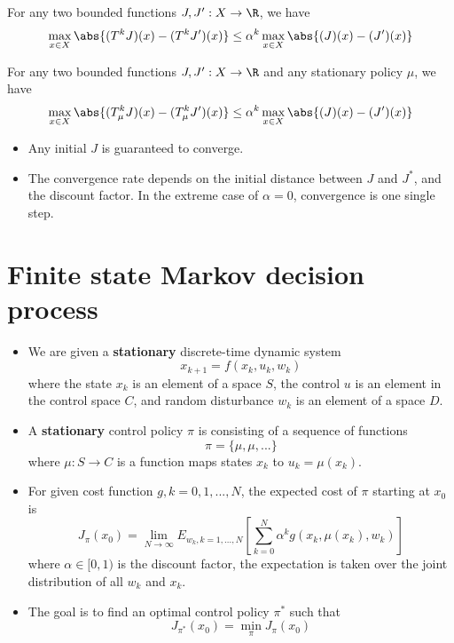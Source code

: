 \begin{refsection}
\begin{corollary}\cite[18]{bertsekas2012dynamic2}
	For any two bounded functions $J,J':X\to \R$, we have
	$$\max_{x\in X} \abs{(T^k J)(x) -(T^k J')(x) } \leq \alpha^k \max_{x\in X} \abs{(J)(x) -(J')(x) }$$
\end{corollary}

\begin{corollary}\cite[18]{bertsekas2012dynamic2}
For any two bounded functions $J,J':X\to \R$ and any stationary policy $\mu$, we have
$$\max_{x\in X} \abs{(T^k_\mu J)(x) -(T^k_\mu J')(x) } \leq \alpha^k \max_{x\in X} \abs{(J)(x) -(J')(x) }$$
\end{corollary}


\begin{remark}\hfill
\begin{itemize}
	\item Any initial $J$ is guaranteed to converge.
	\item The convergence rate depends on the initial distance between $J$ and $J^*$, and the discount factor. In the extreme case of $\alpha = 0$, convergence is one single step.
\end{itemize}	
\end{remark}



\section{Finite state Markov decision process}
\begin{definition}\hfill
	\begin{itemize}
		\item We are given a \textbf{stationary} discrete-time dynamic system
		$$x_{k+1}  =  f(x_k,u_k,w_k)$$
		where the state $x_k$ is an element of a space $S$, the control $u$ is an element in the control space $C$, and random disturbance $w_k$ is an element of a space $D$.
		\item A \textbf{stationary} control policy $\pi$ is consisting of a sequence of functions
		$$\pi = \{\mu,\mu,...\}$$
		where $\mu:S\to C$ is a function  maps states $x_k$ to $u_k = \mu(x_k)$.
		\item For given cost function $g,k=0,1,...,N$, the expected cost of $\pi$ starting at $x_0$ is
		$$J_\pi(x_0) = \lim_{N\to\infty}E_{w_k,k=1,...,N}[\sum_{k=0}^N \alpha^k g(x_k,\mu(x_k),w_k)]$$
		where $\alpha\in [0,1)$ is the discount factor, the expectation is taken over the joint distribution of all $w_k$ and $x_k$.
		\item The goal is to find an optimal control policy $\pi^*$ such that 
		$$J_{\pi^*}(x_0) = \min_{\pi} J_\pi(x_0)$$
	\end{itemize}
\end{definition}



\end{refsection}
